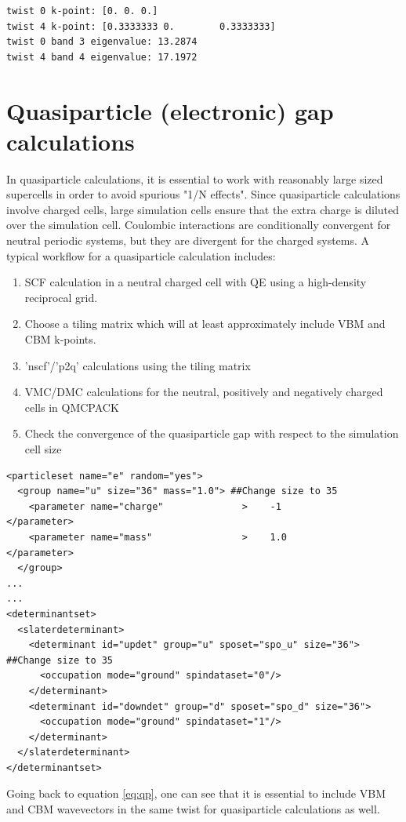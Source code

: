 \begin{lstlisting}[style=Python]
twist 0 k-point: [0. 0. 0.]
twist 4 k-point: [0.3333333 0.        0.3333333]
twist 0 band 3 eigenvalue: 13.2874
twist 4 band 4 eigenvalue: 17.1972
\end{lstlisting}

\section{Quasiparticle (electronic) gap calculations}\label{sec:lab_ex_qp}
In quasiparticle calculations, it is essential to work with reasonably large sized supercells in order to avoid spurious "1/N effects". 
Since quasiparticle calculations involve charged cells, large simulation cells ensure that the extra charge is diluted over the simulation cell. Coulombic interactions are conditionally convergent for neutral periodic systems, but they are divergent for the charged systems. 
A typical workflow for a quasiparticle calculation includes:
\begin{enumerate}
	\item SCF calculation in a neutral charged cell with QE using a high-density reciprocal grid.
	\item Choose a tiling matrix which will at least approximately include VBM and CBM k-points. 
	\item 'nscf'/'p2q' calculations using the tiling matrix 
	\item VMC/DMC calculations for the neutral, positively and negatively charged cells in QMCPACK
	\item Check the convergence of the quasiparticle gap with respect to the simulation cell size
\end{enumerate}
\begin{lstlisting}[style=QMCPXML]
<particleset name="e" random="yes">
  <group name="u" size="36" mass="1.0"> ##Change size to 35
    <parameter name="charge"              >    -1                    </parameter>
    <parameter name="mass"                >    1.0                   </parameter>
  </group>
...
...
<determinantset>
  <slaterdeterminant>
    <determinant id="updet" group="u" sposet="spo_u" size="36"> ##Change size to 35
      <occupation mode="ground" spindataset="0"/>	
    </determinant>
    <determinant id="downdet" group="d" sposet="spo_d" size="36">
      <occupation mode="ground" spindataset="1"/>	
    </determinant>
  </slaterdeterminant>
</determinantset>
\end{lstlisting}
Going back to equation \ref{eq:qp}, one can see that it is essential to include VBM and CBM wavevectors in the same twist for quasiparticle calculations as well. 
